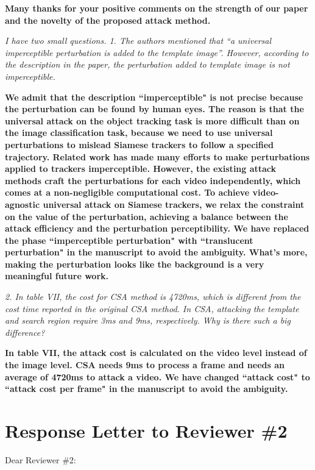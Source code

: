 \documentclass[12pt]{article}
\begin{document}
\textbf{Many thanks for your positive comments on the strength of our paper and the novelty of the proposed attack method.}

\textit{I have two small questions. 1. The authors mentioned that “a universal imperceptible perturbation is added to the template image”. However, according to the description in the paper, the perturbation added to template image is not imperceptible.}

\textbf{
We admit that the description “imperceptible" is not precise because the perturbation can be found by human eyes. The reason is that the universal attack on the object tracking task is more difficult than on the image classification task, because we need to use universal perturbations to mislead Siamese trackers to follow a specified trajectory.
Related work \cite{SPARK, CSA} has made many efforts to make perturbations applied to trackers imperceptible. However, the existing attack methods craft the perturbations for each video independently, which comes at a non-negligible computational cost. To achieve video-agnostic universal attack on Siamese trackers, we relax the constraint on the value of the perturbation, achieving a balance between the attack efficiency and the perturbation perceptibility.
We have replaced the phase ``imperceptible perturbation" with ``translucent perturbation" \cite{zolfi2021translucent} in the manuscript to avoid the ambiguity.
What's more, making the perturbation looks like the background is a very meaningful future work.}

\textit{2. In table VII, the cost for CSA method is 4720ms, which is different from the cost time reported in the original CSA method. In CSA, attacking the template and search region require 3ms and 9ms, respectively. Why is there such a big difference?}

\textbf{In table VII, the attack cost is calculated on the video level instead of the image level. CSA needs 9ms to process a frame and needs an average of 4720ms to attack a video. We have changed ``attack cost" to ``attack cost per frame" in the manuscript to avoid the ambiguity.}

\newpage
{\centering\section*{Response Letter to Reviewer \#2}}
\noindent Dear Reviewer \#2:
\end{document}
